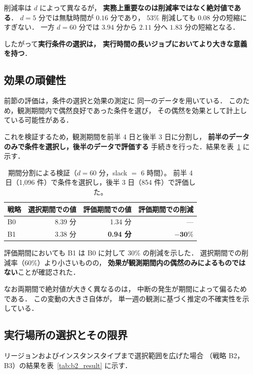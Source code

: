 \documentclass[11pt,a4paper]{ltjsreport}
\begin{document}
削減率は $d$ によって異なるが，
\textbf{実務上重要なのは削減率ではなく絶対値である}．
$d = 5$ 分では無駄時間が $0.16$ 分であり，
$53\%$ 削減しても $0.08$ 分の短縮にすぎない．
一方 $d = 60$ 分では $3.94$ 分から $2.11$ 分へ
$1.83$ 分の短縮となる．

したがって\textbf{実行条件の選択は，
実行時間の長いジョブにおいてより大きな意義を持つ}．

\subsection{効果の頑健性}
\label{sec:holdout}

前節の評価は，条件の選択と効果の測定に
同一のデータを用いている．
このため，観測期間内で偶然良好であった条件を選び，
その偶然を効果として計上している可能性がある．

これを検証するため，観測期間を前半 4 日と後半 3 日に分割し，
\textbf{前半のデータのみで条件を選択し，後半のデータで評価する}
手続きを行った．結果を表~\ref{tab:holdout} に示す．

\begin{table}[htbp]
\centering
\caption{期間分割による検証（$d = 60$ 分，slack $=$ 6 時間）。
前半 4 日（1,096 件）で条件を選択し，後半 3 日（854 件）で評価した。}
\label{tab:holdout}
\small
\begin{tabular}{@{}lrrr@{}}
\toprule
戦略 & 選択期間での値 & \textbf{評価期間での値} & 評価期間での削減 \\
\midrule
B0 & 8.39 分 & 1.34 分 & --- \\
B1 & 3.38 分 & \textbf{0.94 分} & $\mathbf{-30\%}$ \\
\bottomrule
\end{tabular}
\end{table}

評価期間においても B1 は B0 に対して $30\%$ の削減を示した．
選択期間での削減率（$60\%$）より小さいものの，
\textbf{効果が観測期間内の偶然のみによるものではない}ことが確認された．

なお両期間で絶対値が大きく異なるのは，
中断の発生が期間によって偏るためである．
この変動の大きさ自体が，
単一週の観測に基づく推定の不確実性を示している．

\subsection{実行場所の選択とその限界}
\label{sec:b2_limit}

リージョンおよびインスタンスタイプまで選択範囲を広げた場合
（戦略 B2，B3）の結果を表~\ref{tab:b2_result} に示す．
\end{document}
